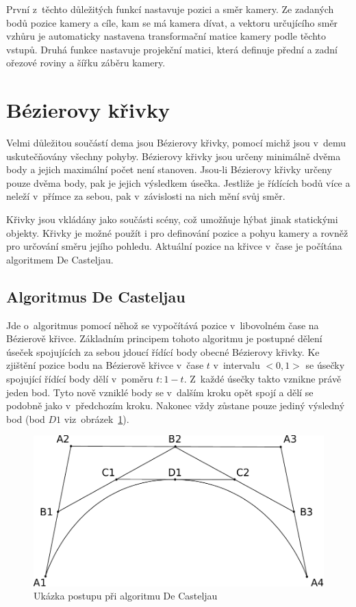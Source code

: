 První z~těchto důležitých funkcí nastavuje pozici a směr kamery.
Ze zadaných bodů pozice kamery a cíle, kam se má kamera dívat, a vektoru určujícího směr vzhůru je automaticky nastavena transformační matice kamery podle těchto vstupů.
Druhá funkce nastavuje projekční matici, která definuje přední a zadní ořezové roviny a šířku záběru kamery.

\section{Bézierovy křivky}
Velmi důležitou součástí dema jsou Bézierovy křivky, pomocí michž jsou v~demu uskutečňovány všechny pohyby.
Bézierovy křivky jsou určeny minimálně dvěma body a jejich maximální počet není stanoven.
Jsou-li Bézierovy křivky určeny pouze dvěma body, pak je jejich výsledkem úsečka. 
Jestliže je řídících bodů více a neleží v~přímce za sebou, pak v~závislosti na nich mění svůj směr. 

Křivky jsou vkládány jako součásti scény, což umožňuje hýbat jinak statickými objekty.
Křivky je možné použít i pro definování pozice a pohyu kamery a rovněž pro určování směru jejího pohledu.
Aktuální pozice na křivce v~čase je počítána algoritmem De Casteljau.

\subsection{Algoritmus De Casteljau}
Jde o~algoritmus pomocí něhož se vypočítává pozice v~libovolném čase na Bézierově křivce.
Základním principem tohoto algoritmu je postupné dělení úseček spojujících za sebou jdoucí řídící body obecné Bézierovy křivky.
Ke zjištění pozice bodu na Bézierově křivce v~čase $t$ v~intervalu $<0,1>$ se úsečky spojující řídící body dělí v~poměru  $t : 1 -t$.
Z~každé úsečky takto vznikne právě jeden bod.
Tyto nově vzniklé body se v~dalším kroku opět spojí a dělí se podobně jako v~předchozím kroku.
Nakonec vždy zůstane pouze jediný výsledný bod (bod $D1$ viz~obrázek~\ref{deCasteljauFIG}).

\begin{figure}[h]
    \begin{center}
      \includegraphics[scale=0.65]{fig/deCasteljau} 
      \caption{Ukázka postupu při algoritmu De Casteljau} 
      \label{deCasteljauFIG}
    \end{center}
\end{figure}

